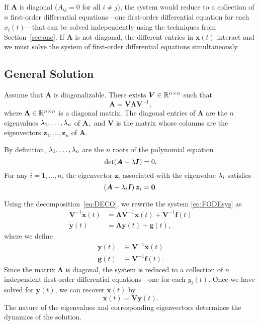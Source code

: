 \documentclass[letterpaper,12pt,leqno]{article}
\begin{document}
If $\bm{A}$ is diagonal ($A_{ij}=0$ for all $i\neq j$), the system would reduce to a collection of $n$ first-order differential equations---one first-order differential equation for each  $x_{i}(t)$---that can be solved independently using the techniques from Section~\ref{sec:one}. If $\bm{A}$ is not diagonal, the different entries in $\bm{x}(t)$ interact and we must solve the system of first-order differential equations simultaneously.

\subsection{General Solution}

Assume that $\bm{A}$ is diagonalizable. There exists $\bm{V}\in \mathbb{R}^{n\times n}$ such that
\begin{equation}
\bm{A}=\bm{V}\bm{\Lambda}\bm{V}^{-1},\label{eq:DECO}
\end{equation}
where $\bm{\Lambda}\in \mathbb{R}^{n\times n}$ is a diagonal matrix. The diagonal entries of $\bm{\Lambda}$ are the $n$ eigenvalues $\lambda_{1},\ldots,\lambda_{n}$ of $\bm{A},$ and $\bm{V}$ is the matrix whose
columns are the eigenvectors $\bm{z}_{1},\ldots,\bm{z}_{n}$ of $\bm{A}$. 

By definition, $\lambda_{1},\ldots,\lambda_{n}$ are the $n$ roots of the polynomial equation
\begin{equation*}
\det(\bm{A}-\lambda \bm{I}) =0.
\end{equation*}
For any $i=1,\dots,n$, the eigenvector $\bm{z}_{i}$ associated with the eigenvalue $\lambda_{i}$ satisfies 
\begin{equation*}
\left( \bm{A}-\lambda_{i} \bm{I} \right) \bm{z}_{i} =\bm{0}.
\end{equation*}

Using the decomposition~\eqref{eq:DECO}, we rewrite the system \eqref{eq:FODEsys} as
\begin{align}
\bm{V}^{-1}\bm{\dot{x}}(t) &=\bm{\Lambda} \bm{V}^{-1}\bm{x}(t) +\bm{V}^{-1}\bm{f}(t)\nonumber\\
\bm{\dot{y}}(t) &=\bm{\Lambda} \bm{y}(t) +\bm{g}(t) ,  \label{eq:FODEsyst}
\end{align}
where we define
\begin{align*}
\bm{y}(t) &\equiv \bm{V}^{-1}\bm{x}(t)\\
\bm{g}(t) &\equiv \bm{V}^{-1}\bm{f}(t).
\end{align*}
Since the matrix $\bm{\Lambda}$ is diagonal, the system is reduced to a collection of $n$ independent first-order differential equations---one for each $y_{i}(t)$. Once we have solved for $\bm{y}(t)$, we can recover $\bm{x}(t)$ by 
\begin{equation*}
\bm{x}(t) =\bm{V} \bm{y}(t) .
\end{equation*}
The nature of the eigenvalues and corresponding eigenvectors determines the dynamics of the solution.
\end{document}
